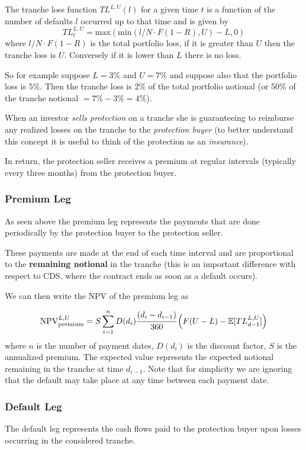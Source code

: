 The tranche loss function $TL^{L,U}(l)$ for a given time $t$ is a function of the number of defaults $l$ occurred up to that time and is given by
\begin{equation*}
TL_{t}^{L,U}=\mathrm{max}(\mathrm{min}(l/N\cdot F(1-R), U)-L, 0)
\end{equation*}
where $l/N\cdot F(1-R)$ is the total portfolio loss, if it is greater than $U$ then the tranche loss is $U$. Conversely if it is lower than $L$ there is no loss.

So for example suppose $L=3\%$ and $U=7\%$ and suppose also that the portfolio loss is $5\%$. Then the tranche loss is 2\% of the total portfolio notional (or 50\% of the tranche notional $=7\%-3\%=4\%$).

When an investor \emph{sells protection} on a tranche she is guaranteeing to reimburse any realized losses on the tranche to the \emph{protection buyer} (to better understand this concept it is useful to think of the protection as an \emph{insurance}). 

In return, the protection seller receives a premium at regular intervals (typically every three months) from the protection buyer.

\subsubsection{Premium Leg}
As seen above the premium leg represents the payments that are done periodically by the protection buyer to the protection seller.

These payments are made at the end of each time interval and are proportional to the \textbf{remaining notional} in the tranche (this is an important difference with respect to CDS, where the contract ends as soon as a default occurs).

We can then write the NPV of the premium leg as

\begin{equation}
\mathrm{NPV}_{\mathrm{premium}}^{L,U}=S\sum^{n}_{i=1}D(d_i)\cfrac{(d_i - d_{i-1})}{360}\left(F(U-L)-\mathbb{E}[TL_{d-1}^{L,U}]\right)
\label{eq:cdo_npv_premium}
\end{equation}
where $n$ is the number of payment dates, $D(d_i)$ is the discount factor, $S$ is the annualized premium. The expected value represents the expected notional remaining in the tranche at time 
$d_{i-1}$.
Note that for simplicity we are ignoring that the default may take place at any time between each payment date.

\subsubsection{Default Leg}
The default leg represents the cash flows paid to the protection buyer upon losses occurring in the considered tranche. 

